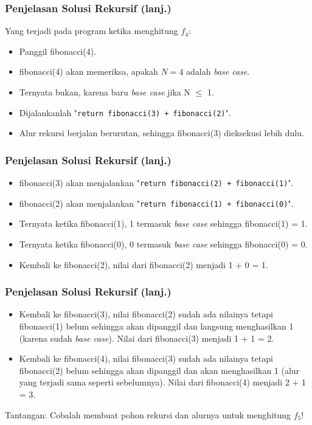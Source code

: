 \begin{frame}
\frametitle{Penjelasan Solusi Rekursif (lanj.)}
Yang terjadi pada program ketika menghitung $f_4$:
\begin {itemize}
  \item Panggil fibonacci(4).
  \item fibonacci(4) akan memeriksa, apakah $N=4$ adalah \textit{base case}.
  \item Ternyata bukan, karena baru \textit{base case} jika N $\le$ 1.
  \item Dijalankanlah "\texttt{return fibonacci(3) + fibonacci(2)}".
  \item Alur rekursi berjalan berurutan, sehingga fibonacci(3) dieksekusi lebih dulu.
\end{itemize}
\end{frame}

\begin{frame}
\frametitle{Penjelasan Solusi Rekursif (lanj.)}
\begin{itemize}
  \item fibonacci(3) akan menjalankan "\texttt{return fibonacci(2) + fibonacci(1)}".
  \item fibonacci(2) akan menjalankan "\texttt{return fibonacci(1) + fibonacci(0)}".
  \item Ternyata ketika fibonacci(1), 1 termasuk \textit{base case} sehingga fibonacci(1) = 1.
  \item Ternyata ketika fibonacci(0), 0 termasuk \textit{base case} sehingga fibonacci(0) = 0.
  \item Kembali ke fibonacci(2), nilai dari fibonacci(2) menjadi 1 + 0 = 1.
\end{itemize}
\end{frame}

\begin{frame}
\frametitle{Penjelasan Solusi Rekursif (lanj.)}
\begin {itemize}
  \item Kembali ke fibonacci(3), nilai fibonacci(2) sudah ada nilainya tetapi fibonacci(1) belum sehingga akan dipanggil dan langsung menghasilkan 1 (karena sudah \textit{base case}). Nilai dari fibonacci(3) menjadi 1 + 1 = 2.
  \item Kembali ke fibonacci(4), nilai fibonacci(3) sudah ada nilainya tetapi fibonacci(2) belum sehingga akan dipanggil dan akan menghasilkan 1 (alur yang terjadi sama seperti sebelumnya). Nilai dari fibonacci(4) menjadi 2 + 1 = 3.
\end{itemize}
Tantangan: Cobalah membuat pohon rekursi dan alurnya untuk menghitung $f_5$!
\end{frame}

